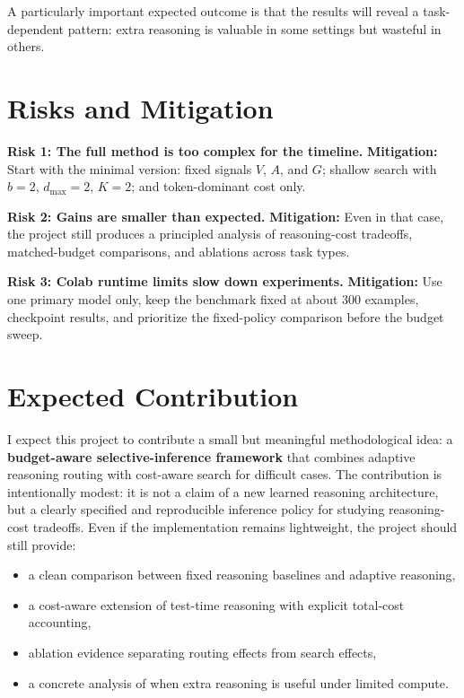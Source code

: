 \documentclass[10pt]{article}
\begin{document}
A particularly important expected outcome is that the results will reveal a task-dependent pattern: extra reasoning is valuable in some settings but wasteful in others.

\section{Risks and Mitigation}
\textbf{Risk 1: The full method is too complex for the timeline.}  
\textbf{Mitigation:} Start with the minimal version: fixed signals $V$, $A$, and $G$; shallow search with $b=2$, $d_{\max}=2$, $K=2$; and token-dominant cost only.

\textbf{Risk 2: Gains are smaller than expected.}  
\textbf{Mitigation:} Even in that case, the project still produces a principled analysis of reasoning-cost tradeoffs, matched-budget comparisons, and ablations across task types.

\textbf{Risk 3: Colab runtime limits slow down experiments.}  
\textbf{Mitigation:} Use one primary model only, keep the benchmark fixed at about 300 examples, checkpoint results, and prioritize the fixed-policy comparison before the budget sweep.

\section{Expected Contribution}
I expect this project to contribute a small but meaningful methodological idea: a \textbf{budget-aware selective-inference framework} that combines adaptive reasoning routing with cost-aware search for difficult cases. The contribution is intentionally modest: it is not a claim of a new learned reasoning architecture, but a clearly specified and reproducible inference policy for studying reasoning-cost tradeoffs. Even if the implementation remains lightweight, the project should still provide:
\begin{itemize}[leftmargin=1.2em,itemsep=0.08em]
    \item a clean comparison between fixed reasoning baselines and adaptive reasoning,
    \item a cost-aware extension of test-time reasoning with explicit total-cost accounting,
    \item ablation evidence separating routing effects from search effects,
    \item a concrete analysis of when extra reasoning is useful under limited compute.
\end{itemize}
\end{document}
